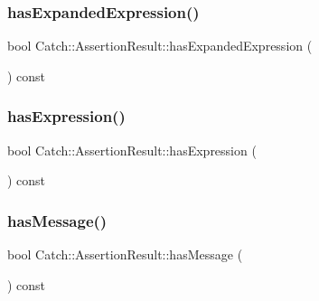 \hypertarget{class_catch_1_1_assertion_result_a78c43506c2b3d8cc1fb141a97d09ec94}{}\label{class_catch_1_1_assertion_result_a78c43506c2b3d8cc1fb141a97d09ec94} 
\subsubsection{\texorpdfstring{has\+Expanded\+Expression()}{hasExpandedExpression()}}
{\footnotesize\ttfamily bool Catch\+::\+Assertion\+Result\+::has\+Expanded\+Expression (\begin{DoxyParamCaption}{ }\end{DoxyParamCaption}) const}

\hypertarget{class_catch_1_1_assertion_result_aba37b4fef1015989df2136592958e984}{}\label{class_catch_1_1_assertion_result_aba37b4fef1015989df2136592958e984} 
\subsubsection{\texorpdfstring{has\+Expression()}{hasExpression()}}
{\footnotesize\ttfamily bool Catch\+::\+Assertion\+Result\+::has\+Expression (\begin{DoxyParamCaption}{ }\end{DoxyParamCaption}) const}

\hypertarget{class_catch_1_1_assertion_result_aae37064b401919fa8ac480ef86cca924}{}\label{class_catch_1_1_assertion_result_aae37064b401919fa8ac480ef86cca924} 
\subsubsection{\texorpdfstring{has\+Message()}{hasMessage()}}
{\footnotesize\ttfamily bool Catch\+::\+Assertion\+Result\+::has\+Message (\begin{DoxyParamCaption}{ }\end{DoxyParamCaption}) const}

\hypertarget{class_catch_1_1_assertion_result_ae39658b71c4afc3c8a859043b0e97027}{}\label{class_catch_1_1_assertion_result_ae39658b71c4afc3c8a859043b0e97027} 
